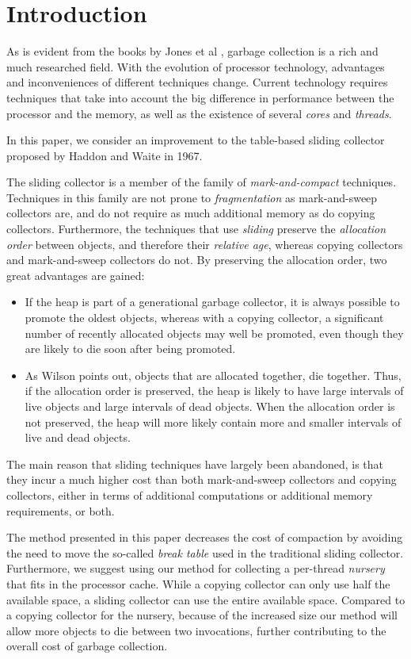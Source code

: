 \section{Introduction}

As is evident from the books by Jones et al
\cite{Jones:2011:GCH:2025255} \cite{Jones:1996:GCA:236254}, garbage
collection is a rich and much researched field.  With the evolution of
processor technology, advantages and inconveniences of different
techniques change.  Current technology requires techniques that take
into account the big difference in performance between the processor
and the memory, as well as the existence of several \emph{cores} and
\emph{threads}.

In this paper, we consider an improvement to the table-based sliding
collector proposed by Haddon and Waite \cite{Haddon:1967} in 1967.

The sliding collector is a member of the family of
\emph{mark-and-compact} techniques.  Techniques in this family are not
prone to \emph{fragmentation} as mark-and-sweep collectors are, and do
not require as much additional memory as do copying collectors.
Furthermore, the techniques that use \emph{sliding} preserve the
\emph{allocation order} between objects, and therefore their
\emph{relative age}, whereas copying collectors and mark-and-sweep
collectors do not.  By preserving the allocation order, two great
advantages are gained:

\begin{itemize}
\item If the heap is part of a generational garbage collector, it is
  always possible to promote the oldest objects, whereas with a
  copying collector, a significant number of recently allocated 
  objects may well be promoted, even though they are likely to die
  soon after being promoted. 
\item As Wilson \cite{Wilson:1992:UGC:645648.664824} points out,
  objects that are allocated together, die together.  Thus, if the
  allocation order is preserved, the heap is likely to have
  large intervals of live objects and large intervals of dead
  objects.  When the allocation order is not preserved, the heap will
  more likely contain more and smaller intervals of live and dead
  objects. 
\end{itemize}

The main reason that sliding techniques have largely been abandoned,
is that they incur a much higher cost than both mark-and-sweep
collectors and copying collectors, either in terms of additional
computations or additional memory requirements, or both. 

The method presented in this paper decreases the cost of compaction by
avoiding the need to move the so-called \emph{break table} used in the
traditional sliding collector.  Furthermore, we suggest using our
method for collecting a per-thread \emph{nursery} that fits in the
processor cache.  While a copying collector can only use half the
available space, a sliding collector can use the entire available
space.  Compared to a copying collector for the nursery, because of
the increased size our method will allow more objects to die between
two invocations, further contributing to the overall cost of garbage
collection. 
